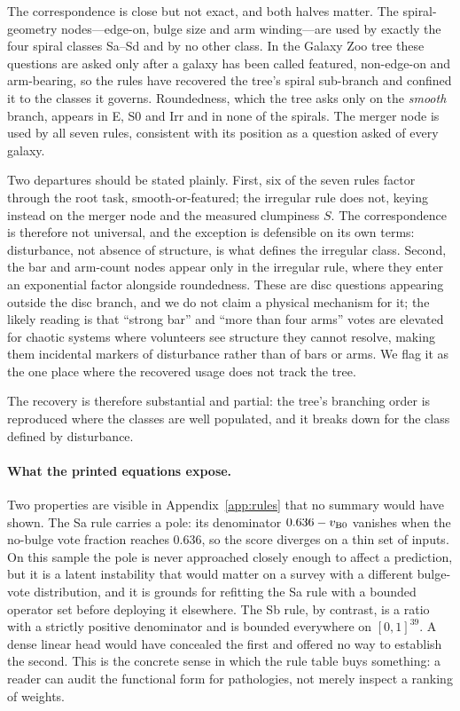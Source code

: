 \documentclass[11pt]{article}
\begin{document}
The correspondence is close but not exact, and both halves matter. The
spiral-geometry nodes---edge-on, bulge size and arm winding---are used by
exactly the four spiral classes Sa--Sd and by no other class. In the Galaxy
Zoo tree these questions are asked only after a galaxy has been called
featured, non-edge-on and arm-bearing, so the rules have recovered the tree's
spiral sub-branch and confined it to the classes it governs. Roundedness,
which the tree asks only on the \emph{smooth} branch, appears in E, S0 and Irr
and in none of the spirals. The merger node is used by all seven rules,
consistent with its position as a question asked of every galaxy.

Two departures should be stated plainly. First, six of the seven rules factor
through the root task, smooth-or-featured; the irregular rule does not, keying
instead on the merger node and the measured clumpiness $S$. The correspondence
is therefore not universal, and the exception is defensible on its own terms:
disturbance, not absence of structure, is what defines the irregular class. Second, the bar and
arm-count nodes appear only in the irregular rule, where they enter an
exponential factor alongside roundedness. These are disc questions appearing
outside the disc branch, and we do not claim a physical mechanism for it; the
likely reading is that ``strong bar'' and ``more than four arms'' votes are
elevated for chaotic systems where volunteers see structure they cannot
resolve, making them incidental markers of disturbance rather than of bars or
arms. We flag it as the one place where the recovered usage does not track the
tree.

The recovery is therefore substantial and partial: the tree's branching order
is reproduced where the classes are well populated, and it breaks down for the
class defined by disturbance.

\paragraph{What the printed equations expose.}
Two properties are visible in Appendix~\ref{app:rules} that no summary would
have shown. The Sa rule carries a pole: its denominator $0.636 - v_{\rm B0}$
vanishes when the no-bulge vote fraction reaches $0.636$, so the score
diverges on a thin set of inputs. On this sample the pole is never approached
closely enough to affect a prediction, but it is a latent instability that
would matter on a survey with a different bulge-vote distribution, and it is
grounds for refitting the Sa rule with a bounded operator set before deploying
it elsewhere. The Sb rule, by contrast, is a ratio with a strictly positive
denominator and is bounded everywhere on $[0,1]^{39}$. A dense linear head
would have concealed the first and offered no way to establish the second.
This is the concrete sense in which the rule table buys something: a reader
can audit the functional form for pathologies, not merely inspect a ranking of
weights.
\end{document}
